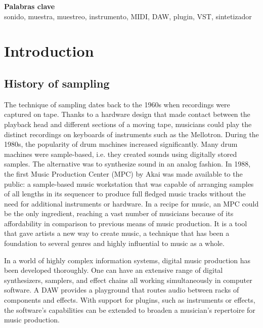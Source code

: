 \documentclass[12pt , a4paper]{article}
\begin{document}
	\large
	\textbf{Palabras clave}\\
	
	\vspace{-1em}
	\normalsize	
	\noindent sonido, muestra, muestreo, instrumento, MIDI, DAW, plugin, VST, sintetizador
	
	
	
	\newpage
	\tableofcontents


	\newpage
	\section{Introduction}
	\subsection{History of sampling}
	
	The technique of sampling dates back to the 1960s when recordings were captured on tape. Thanks to a hardware design that made contact between the playback head and different sections of a moving tape, musicians could play the distinct recordings on keyboards of instruments such as the Mellotron. During the 1980s, the popularity of drum machines increased significantly. Many drum machines were sample-based, i.e. they created sounds using digitally stored samples. The alternative was to synthesize sound in an analog fashion. In 1988, the first Music Production Center (MPC) by Akai was made available to the public: a sample-based music workstation that was capable of arranging samples of all lengths in its sequencer to produce full fledged music tracks without the need for additional instruments or hardware. In a recipe for music, an MPC could be the only ingredient, reaching a vast number of musicians because of its affordability in comparison to previous means of music production. It is a tool that gave artists a new way to create music, a technique that has been a foundation to several genres and highly influential to music as a whole.
	\par	
	In a world of highly complex information systems, digital music production has been developed thoroughly. One can have an extensive range of digital synthesizers, samplers, and effect chains all working simultaneously in computer software. A DAW provides a playground that routes audio between racks of components and effects. With support for plugins, such as instruments or effects, the software's capabilities can be extended to broaden a musician's repertoire for music production. 
\end{document}
